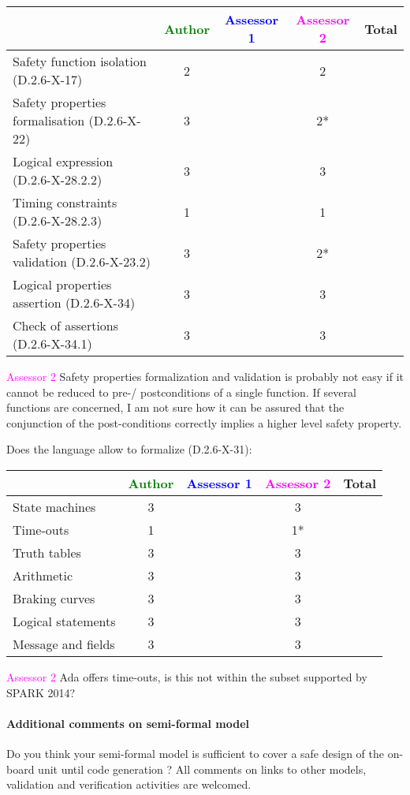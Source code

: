\begin{tabular}{|l | c | c | c | c|}
\hline
& \textcolor{green}{Author} & \textcolor{blue}{Assessor 1} & \textcolor{magenta}{Assessor 2} & Total \\
\hline 
Safety function isolation (D.2.6-X-17)  & 2 & & 2 &  \\
\hline 
Safety properties formalisation (D.2.6-X-22)  & 3 & & 2* &  \\
\hline
Logical expression (D.2.6-X-28.2.2)  & 3 & & 3 &  \\
\hline
Timing constraints (D.2.6-X-28.2.3)  & 1 & & 1 &  \\
\hline
Safety properties validation (D.2.6-X-23.2)  & 3 & & 2* &  \\
\hline
Logical properties assertion (D.2.6-X-34)  & 3 & & 3 &  \\
\hline
Check  of assertions (D.2.6-X-34.1)  & 3 & & 3 &  \\
\hline
\end{tabular}

\textcolor{magenta}{Assessor 2} Safety properties formalization and validation
is probably not easy if it cannot be reduced to pre-/ postconditions of a single
function. If several functions are concerned, I am not sure how it can be
assured that the conjunction of the post-conditions correctly implies a higher
level safety property.

Does the language allow to  formalize (D.2.6-X-31):

\begin{tabular}{|l | c | c | c | c|}
\hline
& \textcolor{green}{Author} & \textcolor{blue}{Assessor 1} & \textcolor{magenta}{Assessor 2} & Total \\
\hline 
State machines  & 3 & & 3 &  \\
\hline
Time-outs  & 1 & & 1* &  \\
\hline
Truth tables  & 3 & & 3 &  \\
\hline
Arithmetic  & 3 & & 3 &  \\
\hline
Braking curves  & 3 & & 3 &  \\
\hline
Logical statements & 3 & & 3 &  \\
\hline
Message and fields & 3 & & 3 &  \\
\hline
\end{tabular}

\textcolor{magenta}{Assessor 2} Ada offers time-outs, is this not within the
subset supported by SPARK 2014?

\paragraph{Additional comments on semi-formal  model} Do you think your semi-formal  model is sufficient to cover a safe design of the on-board unit until code generation ?
All comments on links to  other models, validation and verification activities are welcomed.

